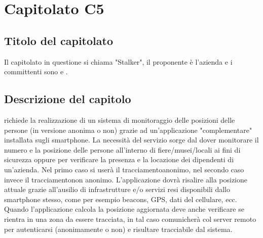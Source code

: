 \section{Capitolato C5}
\subsection{Titolo del capitolato}
Il capitolato in questione si chiama "Stalker", il proponente \`e l'azienda \Proponente{} e i committenti sono \VT{} e \CR{}.

\subsection{Descrizione del capitolo}
\NomeProgetto{} richiede la realizzazione di un sistema di monitoraggio delle posizioni delle persone (in versione anonima o non) grazie ad un'applicazione "complementare" installata sugli smartphone. La necessità del servizio sorge dal dover monitorare il numero e la posizione delle persone all'interno di fiere/musei/locali ai fini di sicurezza oppure per verificare la presenza e la locazione dei dipendenti di un'azienda. Nel primo caso si user\`a il tracciamentoanonimo, nel secondo caso invece il tracciamentonon anonimo. L'applicazione dovr\`a risalire alla posizione attuale grazie all'ausilio di infrastrutture e/o servizi resi disponibili dallo smartphone stesso, come per esempio beacons, GPS, dati del cellulare, ecc. Quando l'applicazione calcola la posizione aggiornata deve anche verificare se rientra in una zona da essere tracciata, in tal caso comunicherà col server remoto per autenticarsi (anonimamente o non) e risultare tracciabile dal sistema.

